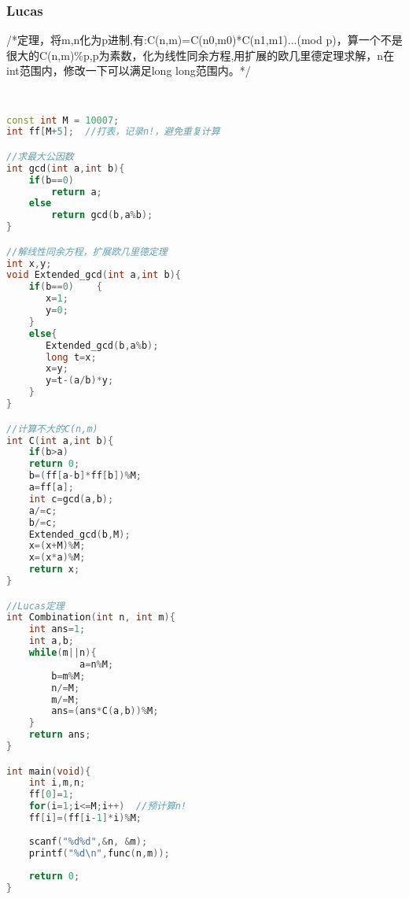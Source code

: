 	\subsubsection{Lucas}
	/*定理，将m,n化为p进制,有:C(n,m)=C(n0,m0)*C(n1,m1)...(mod p)，算一个不是很大的C(n,m)\%p,p为素数，化为线性同余方程,用扩展的欧几里德定理求解，n在int范围内，修改一下可以满足long long范围内。*/\\
		\begin{lstlisting}[language=c++]	

 
const int M = 10007;
int ff[M+5];  //打表，记录n!，避免重复计算

//求最大公因数
int gcd(int a,int b){
    if(b==0)
		return a;
    else
		return gcd(b,a%b);
}

//解线性同余方程，扩展欧几里德定理
int x,y;
void Extended_gcd(int a,int b){
    if(b==0)    {
       x=1;
       y=0;
    }
    else{
       Extended_gcd(b,a%b);
       long t=x;
       x=y;
       y=t-(a/b)*y;
    }
}

//计算不大的C(n,m)
int C(int a,int b){
    if(b>a)
	return 0;
    b=(ff[a-b]*ff[b])%M;
    a=ff[a];
    int c=gcd(a,b);
    a/=c;
    b/=c;
    Extended_gcd(b,M);
    x=(x+M)%M;
    x=(x*a)%M;
    return x;
}

//Lucas定理
int Combination(int n, int m){
    int ans=1;
	int a,b;
	while(m||n){
	         a=n%M;
		b=m%M;
		n/=M;
		m/=M;
		ans=(ans*C(a,b))%M;
	}
	return ans;
}

int main(void){
    int i,m,n;
	ff[0]=1;
	for(i=1;i<=M;i++)  //预计算n!
	ff[i]=(ff[i-1]*i)%M;
	
	scanf("%d%d",&n, &m);
	printf("%d\n",func(n,m));
	
	return 0;
}
		\end{lstlisting}
